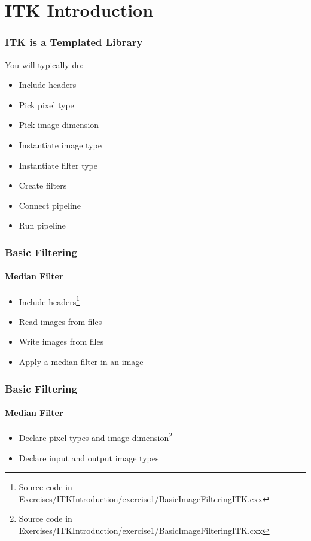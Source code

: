 \section{ITK Introduction}



\begin{frame}
\frametitle{ITK is a Templated Library}
You will typically do:
\begin{itemize}
\item Include headers
\pause
\item Pick pixel type
\pause
\item Pick image dimension
\pause
\item Instantiate image type
\pause
\item Instantiate filter type
\pause
\item Create filters
\pause
\item Connect pipeline
\pause
\item Run pipeline
\end{itemize}
\end{frame}

{
\begin{frame}[fragile]
\frametitle{Basic Filtering}
\framesubtitle{Median Filter}
\begin{itemize}
\item Include headers\footnote{Source code in Exercises/ITKIntroduction/exercise1/BasicImageFilteringITK.cxx}
\end{itemize}
\begin{center}

\end{center}
\pause
\begin{itemize}
\item Read images from files
\item Write images from files
\item Apply a median filter in an image
\end{itemize}
\end{frame}
}

{
\begin{frame}[fragile]
\frametitle{Basic Filtering}
\framesubtitle{Median Filter}
\begin{itemize}
\item Declare pixel types and image dimension\footnote{Source code in Exercises/ITKIntroduction/exercise1/BasicImageFilteringITK.cxx}
\end{itemize}
\begin{center}

\end{center}
\pause
\begin{itemize}
\item Declare input and output image types
\end{itemize}
\begin{center}

\end{center}
\end{frame}
}

